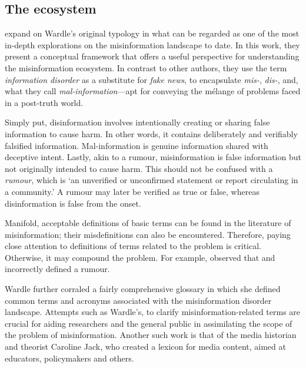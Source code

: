 \subsection{The ecosystem}
\label{ssec:1-ecosystem}

 expand on Wardle's original typology in what can be regarded as one of the most in-depth explorations on the misinformation landscape to date. In this work, they present a conceptual framework that offers a useful perspective for understanding the misinformation ecosystem. In contrast to other authors, they use the term \emph{information disorder} as a substitute for \emph{fake news}, to encapsulate \emph{mis-}, \emph{dis-}, and, what they call \emph{mal-information}—apt for conveying the mélange of problems faced in a post-truth world.

Simply put, disinformation involves intentionally creating or sharing false information to cause harm. In other words, it contains deliberately and verifiably falsified information. Mal-information is genuine information shared with deceptive intent. Lastly, akin to a rumour, misinformation is false information but not originally intended to cause harm. This should not be confused with a \emph{rumour}, which is `an unverified or unconfirmed statement or report circulating in a community.' A rumour may later be verified as true or false, whereas disinformation is false from the onset.

Manifold, acceptable definitions of basic terms can be found in the literature of misinformation; their misdefinitions can also be encountered. Therefore, paying close attention to definitions of terms related to the problem is critical. Otherwise, it may compound the problem. For example,  observed that  and  incorrectly defined a rumour.

Wardle further corraled a fairly comprehensive glossary in which she defined common terms and acronyms associated with the misinformation disorder landscape. Attempts such as Wardle's, to clarify misinformation-related terms are crucial for aiding researchers and the general public in assimilating the scope of the problem of misinformation. Another such work is that of the media historian and theorist Caroline Jack, who created a lexicon for media content, aimed at educators, policymakers and others.

